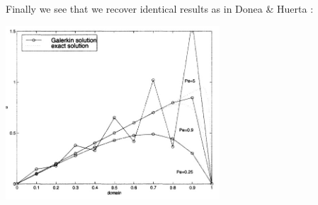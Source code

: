 Finally we see that we recover identical results as in Donea \& Huerta \cite{dohu03}:

\begin{center}
\includegraphics[width=8cm]{python_codes/fieldstone_65/images/dohu}
\end{center}

